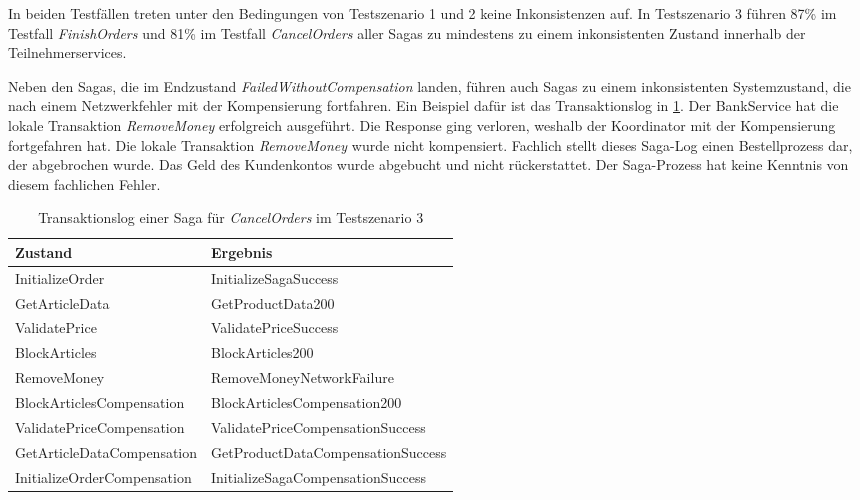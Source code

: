 In beiden Testfällen treten unter den Bedingungen von Testszenario 1 und 2 keine Inkonsistenzen auf. In Testszenario 3 führen 87\% im Testfall \textit{FinishOrders} und 81\% im Testfall \textit{CancelOrders} aller Sagas zu mindestens zu einem inkonsistenten Zustand innerhalb der Teilnehmerservices. 

Neben den Sagas, die im Endzustand \textit{FailedWithoutCompensation} landen, führen auch Sagas zu einem inkonsistenten Systemzustand, die nach einem Netzwerkfehler mit der Kompensierung fortfahren. Ein Beispiel dafür ist das Transaktionslog in \cref{tab:transaktionslog_cancelorders_ts3}. Der BankService hat die lokale Transaktion \textit{RemoveMoney} erfolgreich ausgeführt. Die Response ging verloren, weshalb der Koordinator mit der Kompensierung fortgefahren hat. Die lokale Transaktion \textit{RemoveMoney} wurde nicht kompensiert. Fachlich stellt dieses Saga-Log einen Bestellprozess dar, der abgebrochen wurde. Das Geld des Kundenkontos wurde abgebucht und nicht rückerstattet. Der Saga-Prozess hat keine Kenntnis von diesem fachlichen Fehler.

\begin{center}
	\fontsize{9}{12}\selectfont
	\begin{longtable}[h]{|p{4.5cm}|p{5.5cm}|}
		\hline
		Zustand & Ergebnis \\* \hline
		\endhead
		\caption{Transaktionslog einer Saga für \textit{CancelOrders} im Testszenario 3}
		\label{tab:transaktionslog_cancelorders_ts3}
		\endfoot
		InitializeOrder & InitializeSagaSuccess \\ \hline
		GetArticleData & GetProductData200 \\ \hline
		ValidatePrice & ValidatePriceSuccess \\ \hline
		BlockArticles & BlockArticles200 \\ \hline
		\rowcolor{Gray}
		RemoveMoney & RemoveMoneyNetworkFailure \\ \hline
		\rowcolor{Gray}
		BlockArticlesCompensation & BlockArticlesCompensation200 \\ \hline
		ValidatePriceCompensation & ValidatePriceCompensationSuccess \\ \hline
		GetArticleDataCompensation & GetProductDataCompensationSuccess \\ \hline
		InitializeOrderCompensation & InitializeSagaCompensationSuccess \\ \hline
	\end{longtable}
\end{center}
\FloatBarrier
